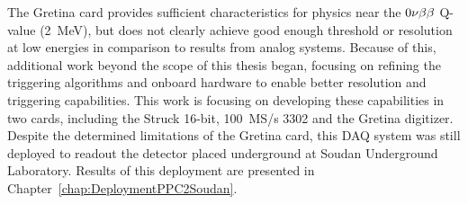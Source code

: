 	The Gretina card provides sufficient characteristics for physics near the $0 \nu \beta \beta$ Q-value (2~MeV), but does not clearly 
achieve good enough threshold or resolution at low energies in comparison to results from analog systems.  Because of this, additional work beyond the scope of this thesis began, focusing on refining the triggering algorithms and onboard hardware to enable better resolution and triggering capabilities.  This work is focusing on developing these capabilities in two cards, including the Struck 16-bit, 100~MS/s 3302 and the Gretina digitizer.  Despite the determined limitations of the Gretina card, this DAQ system was still deployed to readout the  detector placed underground at Soudan Underground Laboratory.  Results of this deployment are presented in Chapter~\ref{chap:DeploymentPPC2Soudan}.
